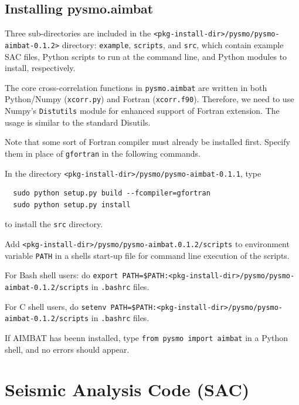 \documentclass[letterpaper,10pt]{article}
\begin{document}
\subsection{Installing pysmo.aimbat}

Three sub-directories are included in the \verb"<pkg-install-dir>/pysmo/pysmo-aimbat-0.1.2>" directory: \verb"example", \verb"scripts", and \verb"src", which contain example SAC files, Python scripts to run at the command line, and Python modules to install, respectively.

The core cross-correlation functions in \verb"pysmo.aimbat" are written in both Python/Numpy (\verb"xcorr.py") and Fortran (\verb"xcorr.f90"). Therefore, we need to use Numpy's \verb"Distutils" module for enhanced support of Fortran extension. The usage is similar to the standard Disutils. 

Note that some sort of Fortran compiler must already be installed first. Specify them in place of \verb"gfortran" in the following commands.

In the directory \verb"<pkg-install-dir>/pysmo/pysmo-aimbat-0.1.1", type

\begin{verbatim}
  sudo python setup.py build --fcompiler=gfortran
  sudo python setup.py install 
\end{verbatim}

to install the \verb"src" directory. 

Add \verb"<pkg-install-dir>/pysmo/pysmo-aimbat.0.1.2/scripts" to environment variable \verb"PATH" in a shells start-up file for command line execution of the scripts.

For Bash shell users: do \verb"export PATH=$PATH:<pkg-install-dir>/pysmo/pysmo-aimbat-0.1.2/scripts" in \verb".bashrc" files.

For C shell users, do \verb"setenv PATH=$PATH:<pkg-install-dir>/pysmo/pysmo-aimbat-0.1.2/scripts" in \verb".bashrc" files.

If AIMBAT has beenn installed, type \verb"from pysmo import aimbat" in a Python shell, and no errors should appear. 


\section{Seismic Analysis Code (SAC)}
\end{document}
